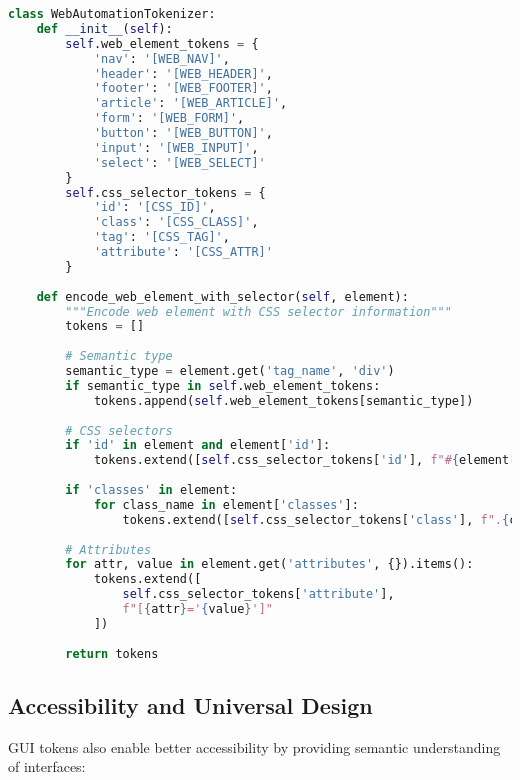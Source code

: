 \begin{lstlisting}[language=Python, caption=Web automation with special tokens]
class WebAutomationTokenizer:
    def __init__(self):
        self.web_element_tokens = {
            'nav': '[WEB_NAV]',
            'header': '[WEB_HEADER]',
            'footer': '[WEB_FOOTER]',
            'article': '[WEB_ARTICLE]',
            'form': '[WEB_FORM]',
            'button': '[WEB_BUTTON]',
            'input': '[WEB_INPUT]',
            'select': '[WEB_SELECT]'
        }
        self.css_selector_tokens = {
            'id': '[CSS_ID]',
            'class': '[CSS_CLASS]',
            'tag': '[CSS_TAG]',
            'attribute': '[CSS_ATTR]'
        }
    
    def encode_web_element_with_selector(self, element):
        """Encode web element with CSS selector information"""
        tokens = []
        
        # Semantic type
        semantic_type = element.get('tag_name', 'div')
        if semantic_type in self.web_element_tokens:
            tokens.append(self.web_element_tokens[semantic_type])
        
        # CSS selectors
        if 'id' in element and element['id']:
            tokens.extend([self.css_selector_tokens['id'], f"#{element['id']}"])
        
        if 'classes' in element:
            for class_name in element['classes']:
                tokens.extend([self.css_selector_tokens['class'], f".{class_name}"])
        
        # Attributes
        for attr, value in element.get('attributes', {}).items():
            tokens.extend([
                self.css_selector_tokens['attribute'],
                f"[{attr}='{value}']"
            ])
        
        return tokens
\end{lstlisting}

\subsection{Accessibility and Universal Design}

GUI tokens also enable better accessibility by providing semantic understanding of interfaces:

